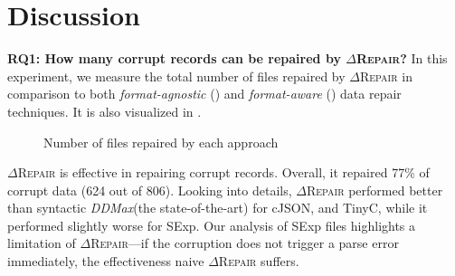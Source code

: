 \documentclass[acmsmall,screen,review,anonymous]{acmart}
\newcommand{\dtask}{data repair\xspace}
\newcommand{\approach}{\textsc{$\Delta$Repair}\xspace}
\newcommand{\ddmax}{\textit{DDMax}\xspace}
\newcommand{\drepair}{\approach}
\begin{document}
\section{Discussion}
\label{sec:discussion}
\noindent\textbf{RQ1: How many corrupt records can be repaired by \drepair?}
In this experiment, we measure the total number of files repaired by \drepair in
comparison to both \emph{format-agnostic} ()
and \emph{format-aware} () \dtask techniques. 
It is also visualized in .
\begin{figure}[!tbp]\centering
\centering
{}\effectivenessdata
\begin{minipage}{.45\textwidth}
\end{minipage}
\caption{Number of files repaired by each approach}
\label{fig:effectiveness}
\end{figure}
\drepair is effective in repairing corrupt records. Overall, it repaired 77\% of corrupt data (624 out of 806).
Looking into details, \drepair performed better than syntactic \ddmax (the state-of-the-art) for cJSON, and TinyC,
while it performed slightly worse for SExp. Our analysis of SExp files
highlights a limitation of \drepair---if the corruption does not trigger a parse
error immediately, the effectiveness naive \drepair suffers.
\end{document}
